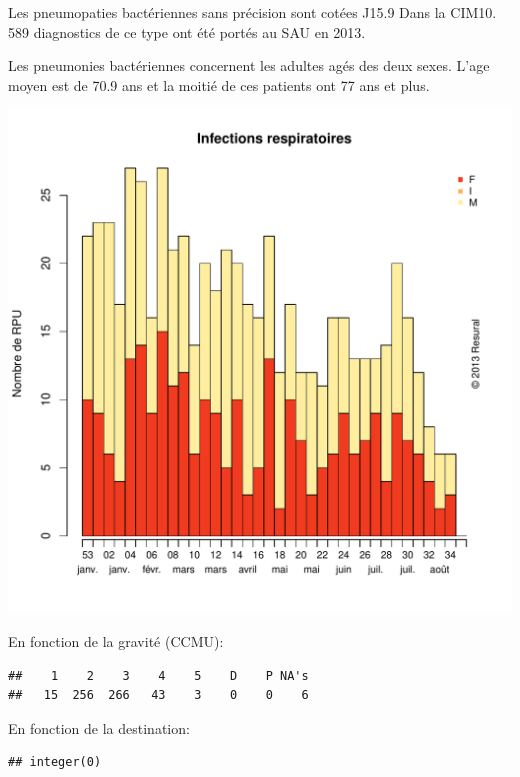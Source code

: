 \documentclass[12pt,english,french,twoside]{report}\usepackage[]{graphicx}\usepackage[]{color}
\makeatletter
\def\maxwidth{ %
  \ifdim\Gin@nat@width>\linewidth
    \linewidth
  \else
    \Gin@nat@width
  \fi
}
\newenvironment{kframe}{%
 \def\at@end@of@kframe{}%
 \ifinner\ifhmode%
  \def\at@end@of@kframe{\end{minipage}}%
  \begin{minipage}{\columnwidth}%
 \fi\fi%
 \def\FrameCommand##1{\hskip\@totalleftmargin \hskip-\fboxsep
 \colorbox{shadecolor}{##1}\hskip-\fboxsep
     \hskip-\linewidth \hskip-\@totalleftmargin \hskip\columnwidth}%
 \MakeFramed {\advance\hsize-\width
   \@totalleftmargin\z@ \linewidth\hsize
   \@setminipage}}%
 {\par\unskip\endMakeFramed%
 \at@end@of@kframe}
\newenvironment{knitrout}{}{} %
\makeatother
\begin{document}
Les pneumopaties bactériennes sans précision sont cotées J15.9 Dans la CIM10.
589 diagnostics de ce type ont été portés au SAU en 2013.

Les pneumonies bactériennes concernent les adultes agés des deux sexes. L'age moyen est de 70.9 ans et la moitié de ces patients ont 77 ans et plus.

\begin{knitrout}
\color{fgcolor}
\includegraphics[width=\maxwidth]{figure/pneumo} 

\end{knitrout}


En fonction de la gravité (CCMU):
\begin{knitrout}
\color{fgcolor}\begin{kframe}
\begin{verbatim}
##    1    2    3    4    5    D    P NA's 
##   15  256  266   43    3    0    0    6
\end{verbatim}
\end{kframe}
\end{knitrout}


En fonction de la destination:
\begin{knitrout}
\color{fgcolor}\begin{kframe}
\begin{verbatim}
## integer(0)
\end{verbatim}
\end{kframe}
\end{knitrout}
\end{document}
